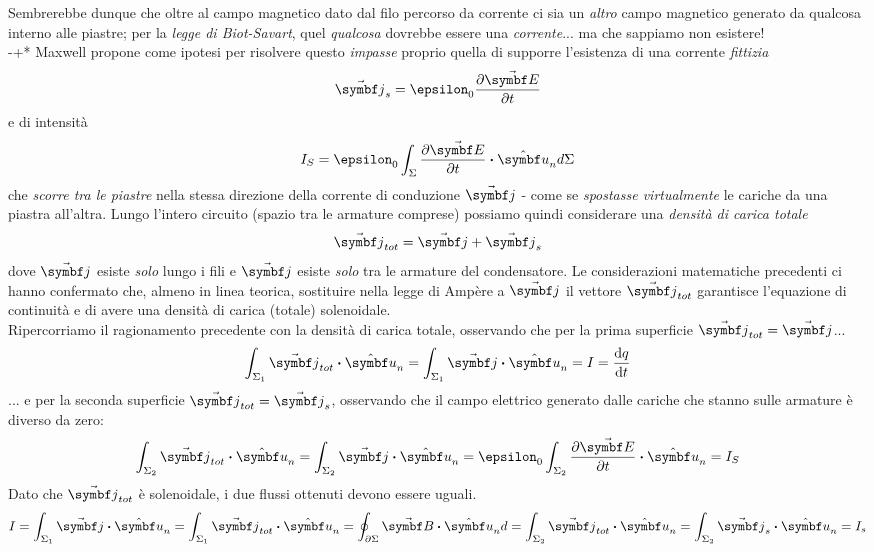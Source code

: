 Sembrerebbe dunque che oltre al campo magnetico dato dal filo percorso da corrente ci sia un \textit{altro} campo magnetico generato da qualcosa interno alle piastre; per la \textit{legge di Biot-Savart}, quel \textit{qualcosa} dovrebbe essere una \textit{corrente}... ma che sappiamo non esistere!\\-+*
Maxwell propone come ipotesi per risolvere questo \textit{impasse} proprio quella di supporre l'esistenza di una corrente \textit{fittizia}
\begin{equation*}
	\vba{j}_s=\epsilon_0\pdv{\vba{E}}{t}
\end{equation*}
e di intensità
\begin{equation*}
	I_S=\epsilon_0\int_{\Sigma}\pdv{\vba{E}}{t}\vdot \vbh{u}_nd\Sigma
\end{equation*}
che \textit{scorre tra le piastre} nella stessa direzione della corrente di conduzione $\vba{j}$ - come se \textit{spostasse virtualmente} le cariche da una piastra all'altra.
Lungo l'intero circuito (spazio tra le armature comprese) possiamo quindi considerare una \textit{densità di carica totale}
\begin{equation*}
	\vba{j}_{tot}=\vba{j}+\vba{j}_s
\end{equation*}
dove $\vba{j}$ esiste \textit{solo} lungo i fili e $\vba{j}$ esiste \textit{solo} tra le armature del condensatore. Le considerazioni matematiche precedenti ci hanno confermato che, almeno in linea teorica, sostituire nella legge di Ampère a $\vba{j}$ il vettore $\vba{j}_{tot}$ garantisce l'equazione di continuità e di avere una densità di carica (totale) solenoidale.\\
Ripercorriamo il ragionamento precedente con la densità di carica totale, osservando che per la prima superficie $\vba{j}_{tot}=\vba{j}$...
\begin{equation*}
	\int_{\Sigma_1}\vba{j}_{tot}\vdot\vbh{u}_n=\int_{\Sigma_1}\vba{j}\vdot\vbh{u}_n=I=\dv{q}{t}
\end{equation*}
... e per la seconda superficie $\vba{j}_{tot}=\vba{j}_s$, osservando che il campo elettrico generato dalle cariche che stanno sulle armature è diverso da zero:
\begin{equation*}
	\int_{\Sigma_2}\vba{j}_{tot}\vdot\vbh{u}_n=\int_{\Sigma_2}\vba{j}\vdot\vbh{u}_n=\epsilon_0\int_{\Sigma_2}\pdv{\vba{E}}{t}\vdot\vbh{u}_n=I_S
\end{equation*}
Dato che $\vba{j}_{tot}$ è solenoidale, i due flussi ottenuti devono essere uguali.
\begin{equation*}
	I=\int_{\Sigma_1}\vba{j}\vdot\vbh{u}_n=\int_{\Sigma_1}\vba{j}_{tot}\vdot\vbh{u}_n=\oint_{\partial \Sigma}\vba{B}\vdot\vbh{u}_nd=\int_{\Sigma_2}\vba{j}_{tot}\vdot\vbh{u}_n=\int_{\Sigma_2}\vba{j}_{s}\vdot\vbh{u}_n=I_s
\end{equation*}
